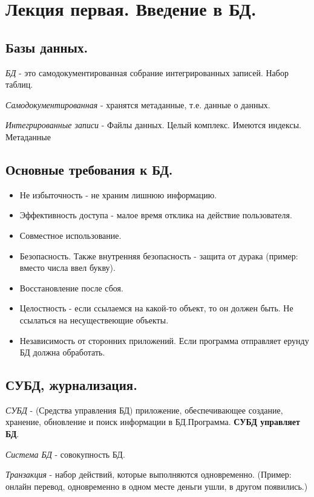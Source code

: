 \chapter{Лекция первая. Введение в БД.}

\section{Базы данных.}

\textit{БД} - это самодокументированная собрание интегрированных записей. Набор таблиц.

\textit{Самодокументированная} - хранятся метаданные, т.е. данные о данных.

\textit{Интегрированные записи} - Файлы данных. Целый комплекс. Имеются индексы. Метаданные

\section{Основные требования к БД.}
\begin{itemize}
	\item Не избыточность - не храним лишнюю информацию.
	\item Эффективность доступа - малое время отклика на действие пользователя.
	\item Совместное использование.
	\item Безопасность. Также внутренняя безопасность - защита от дурака (пример: вместо числа ввел букву).
	\item Восстановление после сбоя.
	\item Целостность - если ссылаемся на какой-то объект, то он должен быть. Не ссылаться на несуществеющие объекты.
	\item Независимость от сторонних приложений. Если программа отправляет ерунду БД должна обработать.
\end{itemize}

\section{СУБД, журнализация.}

\textit{СУБД} - (Средства управления БД) приложение, обеспечивающее создание, хранение, обновление
и поиск информации в БД.Программа.
\textbf{СУБД управляет БД}.

\textit{Система БД} - совокупность БД.

\textit{Транзакция} - набор действий, которые выполняются одновременно.
(Пример: онлайн перевод, одновременно в одном месте деньги ушли, в другом появились.)

